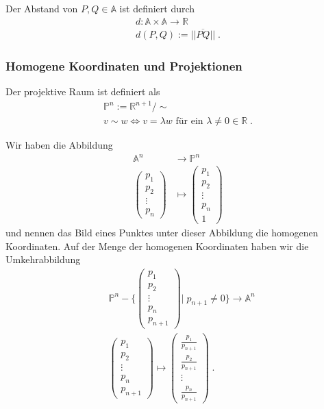 \begin{Definition}
Der Abstand von  $P,Q \in \mathbb{A}$  ist definiert durch
\begin{align*}
d : \mathbb{A} \times \mathbb{A} \to \mathbb{R} \\
d(P,Q) := || \overline{PQ} || \; .
\end{align*}
\end{Definition}


\subsubsection{Homogene Koordinaten und Projektionen}

\begin{Definition}
Der projektive  Raum ist definiert als
\begin{align*}
\mathbb{P}^n := \mathbb{R}^{n+1} / \sim \\
v \sim w \Leftrightarrow v = \lambda w \text{ für ein } \lambda \neq 0 \in \mathbb{R} \; . 
\end{align*}
\end{Definition}

Wir haben die Abbildung
\begin{align*}
\mathbb{A}^n & \to \mathbb{P}^n \\
\begin{pmatrix} p_1 \\ p_2 \\ \vdots \\ p_n \end{pmatrix} & \mapsto \begin{pmatrix} p_1 \\ p_2 \\ \vdots \\ p_n  \\  1\end{pmatrix} 
\end{align*}
und nennen das Bild eines Punktes unter dieser Abbildung die homogenen Koordinaten.
Auf der Menge der homogenen Koordinaten haben wir die Umkehrabbildung
\begin{align*}
& \mathbb{P}^n - \Biggl \{ \begin{pmatrix} p_1 \\ p_2 \\ \vdots \\ p_n  \\  p_{n+1} \end{pmatrix} \Bigg | \; p_{n+1} \neq 0 \Biggr \}   \to \mathbb{A}^n \\
& \begin{pmatrix} p_1 \\ p_2 \\ \vdots \\ p_n  \\  p_{n+1} \end{pmatrix}   \mapsto \begin{pmatrix}  \frac{p_1}{ p_{n+1}} \\ \frac{p_2}{ p_{n+1}}  \\ \vdots \\ \frac{p_n}{ p_{n+1}}  \end{pmatrix}  \; .
\end{align*}


